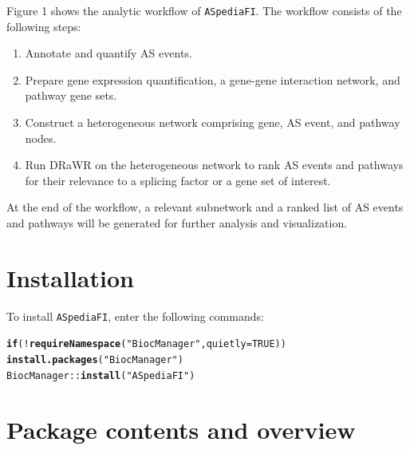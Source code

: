 \documentclass{article}\usepackage[]{graphicx}\usepackage[]{color}
\makeatletter
\newcommand{\hlnum}[1]{\textcolor[rgb]{0.686,0.059,0.569}{#1}}%
\newcommand{\hlstr}[1]{\textcolor[rgb]{0.192,0.494,0.8}{#1}}%
\newcommand{\hlopt}[1]{\textcolor[rgb]{0,0,0}{#1}}%
\newcommand{\hlstd}[1]{\textcolor[rgb]{0.345,0.345,0.345}{#1}}%
\newcommand{\hlkwa}[1]{\textcolor[rgb]{0.161,0.373,0.58}{\textbf{#1}}}%
\newcommand{\hlkwc}[1]{\textcolor[rgb]{0.333,0.667,0.333}{#1}}%
\newcommand{\hlkwd}[1]{\textcolor[rgb]{0.737,0.353,0.396}{\textbf{#1}}}%
\newenvironment{kframe}{%
 \def\at@end@of@kframe{}%
 \ifinner\ifhmode%
  \def\at@end@of@kframe{\end{minipage}}%
  \begin{minipage}{\columnwidth}%
 \fi\fi%
 \def\FrameCommand##1{\hskip\@totalleftmargin \hskip-\fboxsep
 \colorbox{shadecolor}{##1}\hskip-\fboxsep
     \hskip-\linewidth \hskip-\@totalleftmargin \hskip\columnwidth}%
 \MakeFramed {\advance\hsize-\width
   \@totalleftmargin\z@ \linewidth\hsize
   \@setminipage}}%
 {\par\unskip\endMakeFramed%
 \at@end@of@kframe}
\newenvironment{knitrout}{}{} %
\makeatother
\begin{document}
Figure 1 shows the analytic workflow of \texttt{ASpediaFI}. The workflow
consists of the following steps:
\begin{enumerate}
\item Annotate and quantify AS events.
\item Prepare gene expression quantification, a gene-gene interaction
network, and pathway gene sets.
\item Construct a heterogeneous network comprising gene, AS event, and pathway
nodes.
\item Run DRaWR on the heterogeneous network to rank AS events and pathways
for their relevance to a splicing factor or a gene set of interest.
\end{enumerate}
At the end of the workflow, a relevant subnetwork and a ranked list of AS events
and pathways will be generated for further analysis and visualization.

\section{Installation}
To install \texttt{ASpediaFI}, enter the following commands:
\begin{knitrout}
\color{fgcolor}\begin{kframe}
\begin{alltt}
\hlkwa{if} \hlstd{(}\hlopt{!}\hlkwd{requireNamespace}\hlstd{(}\hlstr{"BiocManager"}\hlstd{,} \hlkwc{quietly} \hlstd{=} \hlnum{TRUE}\hlstd{))}
    \hlkwd{install.packages}\hlstd{(}\hlstr{"BiocManager"}\hlstd{)}
\hlstd{BiocManager}\hlopt{::}\hlkwd{install}\hlstd{(}\hlstr{"ASpediaFI"}\hlstd{)}
\end{alltt}
\end{kframe}
\end{knitrout}

\pagebreak

\section{Package contents and overview}

\end{document}
